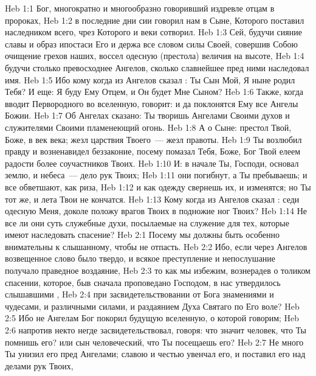 \vs Heb 1:1 Бог, многократно и многообразно говоривший издревле отцам в пророках,
\vs Heb 1:2 в последние дни сии говорил нам в Сыне, Которого поставил наследником всего, чрез Которого и веки сотворил.
\vs Heb 1:3 Сей, будучи сияние славы и образ ипостаси Его и держа все словом силы Своей, совершив Собою очищение грехов наших, воссел одесную (престола) величия на высоте,
\vs Heb 1:4 будучи столько превосходнее Ангелов, сколько славнейшее пред ними наследовал имя.
\vs Heb 1:5 Ибо кому когда из Ангелов сказал : Ты Сын Мой, Я ныне родил Тебя? И еще: Я буду Ему Отцем, и Он будет Мне Сыном?
\vs Heb 1:6 Также, когда вводит Первородного во вселенную, говорит: и да поклонятся Ему все Ангелы Божии.
\vs Heb 1:7 Об Ангелах сказано: Ты творишь Ангелами Своими духов и служителями Своими пламенеющий огонь.
\vs Heb 1:8 А о Сыне: престол Твой, Боже, в век века; жезл царствия Твоего~--- жезл правоты.
\vs Heb 1:9 Ты возлюбил правду и возненавидел беззаконие, посему помазал Тебя, Боже, Бог Твой елеем радости более соучастников Твоих.
\vs Heb 1:10 И: в начале Ты, Господи, основал землю, и небеса~--- дело рук Твоих;
\vs Heb 1:11 они погибнут, а Ты пребываешь; и все обветшают, как риза,
\vs Heb 1:12 и как одежду свернешь их, и изменятся; но Ты тот же, и лета Твои не кончатся.
\vs Heb 1:13 Кому когда из Ангелов сказал : седи одесную Меня, доколе положу врагов Твоих в подножие ног Твоих?
\vs Heb 1:14 Не все ли они суть служебные духи, посылаемые на служение для тех, которые имеют наследовать спасение?
\vs Heb 2:1 Посему мы должны быть особенно внимательны к слышанному, чтобы не отпасть.
\vs Heb 2:2 Ибо, если через Ангелов возвещенное слово было твердо, и всякое преступление и непослушание получало праведное воздаяние,
\vs Heb 2:3 то как мы избежим, вознерадев о толиком спасении, которое, быв сначала проповедано Господом, в нас утвердилось слышавшими ,
\vs Heb 2:4 при засвидетельствовании от Бога знамениями и чудесами, и различными силами, и раздаянием Духа Святаго по Его воле?
\rsbpar\vs Heb 2:5 Ибо не Ангелам Бог покорил будущую вселенную, о которой говорим;
\vs Heb 2:6 напротив некто негде засвидетельствовал, говоря: что значит человек, что Ты помнишь его? или сын человеческий, что Ты посещаешь его?
\vs Heb 2:7 Не много Ты унизил его пред Ангелами; славою и честью увенчал его, и поставил его над делами рук Твоих,
